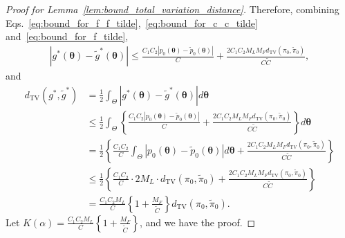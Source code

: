 \documentclass[10pt,a4paper]{amsart}
\begin{document}
\begin{proof}[Proof for Lemma~\ref{lem:bound_total_variation_distance}]
    Therefore, combining Eqs.~\eqref{eq:bound_for_f_f_tilde},~\eqref{eq:bound_for_c_c_tilde} and~\eqref{eq:bound_for_f_tilde},
    \begin{align*}
        \left|g^*(\bm{\theta}) - \tilde{g}^*(\bm{\theta})\right| \leq \frac{C_1 C_2 |p_0(\bm{\theta}) - \tilde{p}_0(\bm{\theta})|}{C} + \frac{2 C_1 C_2 M_L M_F  d_{\mathrm{TV}}(\pi_0, \tilde{\pi}_0)}{C\tilde{C}},
    \end{align*}
    and
    \begin{align*}
        d_{\mathrm{TV}}(g^*, \tilde{g}^*) &= \frac{1}{2}\int_\Theta \left|g^*(\bm{\theta}) - \tilde{g}^*(\bm{\theta}) \right| d\bm{\theta} \\
        &\leq \frac{1}{2}\int_\Theta \left\{ \frac{C_1 C_2 |p_0(\bm{\theta}) - \tilde{p}_0(\bm{\theta})|}{C} + \frac{2 C_1 C_2 M_L M_F  d_{\mathrm{TV}}(\pi_0, \tilde{\pi}_0)}{C\tilde{C}} \right\} d\bm{\theta} \\
        &= \frac{1}{2}\left\{\frac{C_1 C_2}{C}\int_\Theta |p_0(\bm{\theta}) - \tilde{p}_0(\bm{\theta})| d\bm{\theta} + \frac{2 C_1 C_2 M_L M_F  d_{\mathrm{TV}}(\pi_0, \tilde{\pi}_0)}{C\tilde{C}} \right\} \\
        &\leq \frac{1}{2}\left\{\frac{C_1 C_2}{C}\cdot 2M_L \cdot d_{\mathrm{TV}}(\pi_0, \tilde{\pi}_0) + \frac{2 C_1 C_2 M_L M_F  d_{\mathrm{TV}}(\pi_0, \tilde{\pi}_0)}{C\tilde{C}} \right\} \\
        &= \frac{C_1 C_2 M_L}{C} \left\{1 + \frac{M_F}{\tilde{C}}\right\} d_{\mathrm{TV}}(\pi_0, \tilde{\pi}_0).
    \end{align*}
    Let $K(\alpha) = \frac{C_1 C_2 M_L}{C} \left\{1 + \frac{M_F}{\tilde{C}}\right\}$, and we have the proof.
\end{proof}
\end{document}
